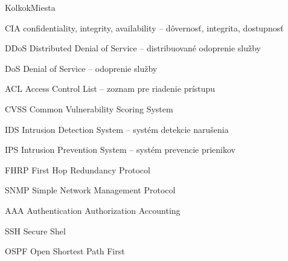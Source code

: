 \begin{seznamzkratek}{KolkokMiesta}

		{CIA} %
		{confidentiality, integrity, availability -- dôvernosť, integrita, dostupnosť} %

		{DDoS} %
		{Distributed Denial of Service -- distribuované odoprenie služby} %
	
	{DoS} %
	{Denial of Service -- odoprenie služby} %

		{ACL} %
		{Access Control List -- zoznam pre riadenie prístupu} %

		{CVSS} %
		{Common Vulnerability Scoring System} %
		
		{IDS} %
		{Intrusion Detection System -- systém detekcie narušenia} %

		{IPS} %
		{Intrusion Prevention System -- systém prevencie prienikov} %

		{FHRP} %
		{First Hop Redundancy Protocol} %

		{SNMP} %
		{Simple Network Management Protocol} %
	
	{AAA} %
	{Authentication Authorization Accounting} %
	
	{SSH} %
	{Secure Shel} %
	
	{OSPF} %
	{Open Shortest Path First } %

\end{seznamzkratek}
